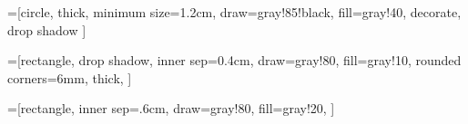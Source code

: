 \documentclass[10pt]{article} %
\begin{document}

\def\methodArrow{latex}
\def\threadArrow{latex}
\def\processArrow{latex}


\def\taskColor{black}

\def\machineColor{gray}
\def\machineCorner{0mm}
\def\chipColor{blue}
\def\chipCorner{1mm}
\def\coreColor{yellow}
\def\coreCorner{1mm}
\def\processColor{purple}
\def\processCorner{2mm}
\def\threadColor{green}
\def\threadCorner{3mm}

\def\fillOpacity{40}
\def\drawOpacity{90}



=[circle,
thick,
minimum size=1.2cm,
draw=gray!85!black,
fill=gray!40,
decorate,
drop shadow
]%


=[rectangle,
drop shadow,
inner sep=0.4cm,
draw=gray!80,
fill=gray!10,
rounded corners=6mm,
thick,
]

=[rectangle,
        inner sep=.6cm,
        draw=gray!80,
        fill=gray!20,
]





\newcommand{\qback}[6]{%
  \begin{pgfonlayer}{background}
    \node[rectangle,
    rounded corners=#1,
    fill=#2!\fillOpacity,
    draw=#2!\drawOpacity,
    inner sep=#3,
    fit=#4] (#5) {#6};
  \end{pgfonlayer}}



\newcommand{\machineBack}[3]{%
  \qback{\machineCorner}{\machineColor}{#1}{#2}{#3}{};
}

\newcommand{\processBack}[3]{%
  \qback{\processCorner}{\processColor}{#1}{#2}{#3}{};
}

\newcommand{\threadBack}[3]{%
  \qback{\threadCorner}{\threadColor}{#1}{#2}{#3}{};
}

\newcommand{\coreBack}[3]{%
  \qback{\coreCorner}{\coreColor}{#1}{#2}{#3}{};
}

\newcommand{\chipBack}[3]{%
  \qback{\chipCorner}{\chipColor}{#1}{#2}{#3}{};
}
\end{document}
